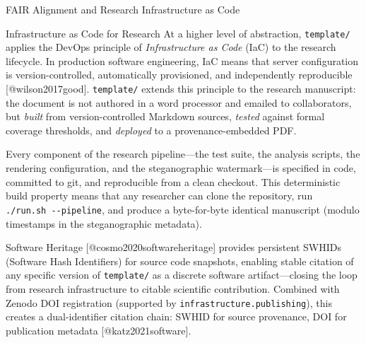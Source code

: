 \documentclass[
  ignorenonframetext,
]{beamer}
\begin{document}
\begin{frame}[fragile]{FAIR Alignment and Research Infrastructure as
Code}
\begin{block}{Infrastructure as Code for Research}
\protect{}\label{infrastructure-as-code-for-research}
At a higher level of abstraction, \texttt{template/} applies the DevOps
principle of \emph{Infrastructure as Code} (IaC) to the research
lifecycle. In production software engineering, IaC means that server
configuration is version-controlled, automatically provisioned, and
independently reproducible {[}@wilson2017good{]}. \texttt{template/}
extends this principle to the research manuscript: the document is not
authored in a word processor and emailed to collaborators, but
\emph{built} from version-controlled Markdown sources, \emph{tested}
against formal coverage thresholds, and \emph{deployed} to a
provenance-embedded PDF.

Every component of the research pipeline---the test suite, the analysis
scripts, the rendering configuration, and the steganographic
watermark---is specified in code, committed to git, and reproducible
from a clean checkout. This deterministic build property means that any
researcher can clone the repository, run
\texttt{./run.sh\ -\/-pipeline}, and produce a byte-for-byte identical
manuscript (modulo timestamps in the steganographic metadata).

Software Heritage {[}@cosmo2020softwareheritage{]} provides persistent
SWHIDs (Software Hash Identifiers) for source code snapshots, enabling
stable citation of any specific version of \texttt{template/} as a
discrete software artifact---closing the loop from research
infrastructure to citable scientific contribution. Combined with Zenodo
DOI registration (supported by \texttt{infrastructure.publishing}), this
creates a dual-identifier citation chain: SWHID for source provenance,
DOI for publication metadata {[}@katz2021software{]}.
\end{block}
\end{frame}
\end{document}
